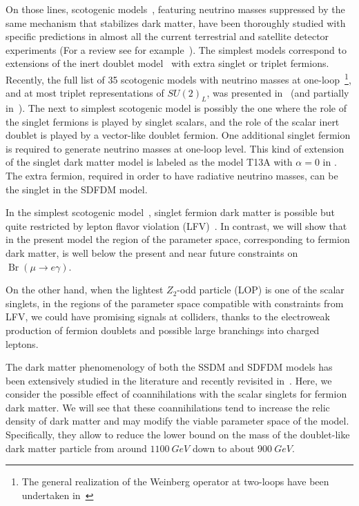 On those lines, scotogenic models~\cite{Ma:2006km}, featuring neutrino masses suppressed
by the same mechanism that stabilizes dark matter, have been thoroughly studied with specific predictions in almost all the
current terrestrial and satellite detector experiments (For a review
see for example~\cite{Boucenna:2014zba}).
The simplest models correspond to extensions of the inert doublet
model~\cite{Deshpande:1977rw,Barbieri:2006dq} with extra singlet or
triplet fermions.
Recently, the full list of 35 scotogenic models with neutrino masses at
one-loop~\cite{Ma:1998dn,Bonnet:2012kz}\footnote{The general
  realization of the Weinberg operator at two-loops have been undertaken
  in~\cite{Sierra:2014rxa}}, and at most triplet representations of
$SU(2)_L$, was presented in~\cite{Restrepo:2013aga} (and partially
in~\cite{Law:2013saa}).
The next to simplest scotogenic model is possibly the one where the
role of the singlet fermions is played by singlet scalars, and the role
of the scalar inert doublet is played by a vector-like doublet fermion.
One additional singlet fermion is required to generate neutrino masses
at one-loop level.
This kind of extension of the singlet dark matter model is labeled
as the model T13A with $\alpha=0$ in \cite{Restrepo:2013aga}. The
extra fermion, required in order to have radiative neutrino masses, can
be the singlet in the SDFDM model.

In the simplest scotogenic model~\cite{Ma:2006km}, singlet fermion
dark matter is possible but quite restricted by lepton flavor
violation (LFV)~\cite{Toma:2013zsa,Vicente:2014wga}. 
In contrast, we will show that in the present model the region of the
parameter space, corresponding to fermion dark matter, is well below
the present and near future constraints on $\operatorname{Br}(\mu\to
e\gamma)$.

On the other hand, when the lightest $Z_2$-odd particle (LOP) is one
of the scalar singlets, in the regions of the parameter space 
compatible with constraints from LFV, we could have promising signals at colliders,
thanks to the electroweak production of fermion doublets and possible
large branchings into charged leptons.

The dark matter phenomenology of both the SSDM and SDFDM models has
been extensively studied in the literature and recently
revisited in~\cite{Abe:2014gua}.
Here, we consider the possible effect of coannihilations with the
scalar singlets for fermion dark matter. 
We will see that these coannihilations tend to increase the relic
density of dark matter and may modify the viable parameter space of
the model. 
Specifically, they allow to reduce the lower bound on the mass of the
doublet-like dark matter particle from around $\SI{1100}{GeV}$ down to
about $\SI{900}{GeV}$.


